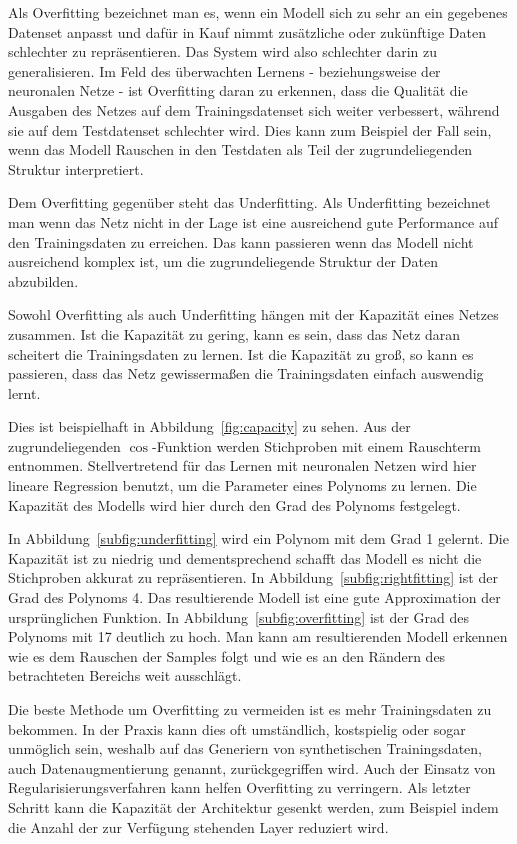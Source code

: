 Als Overfitting bezeichnet man es, wenn ein Modell sich zu sehr an ein gegebenes Datenset anpasst und 
dafür in Kauf nimmt zusätzliche oder zukünftige Daten schlechter zu repräsentieren.
Das System wird also schlechter darin zu generalisieren.
Im Feld des überwachten Lernens - beziehungsweise der neuronalen Netze - ist Overfitting daran zu erkennen,
dass die Qualität die Ausgaben des Netzes auf dem Trainingsdatenset sich weiter verbessert,
während sie auf dem Testdatenset schlechter wird.
Dies kann zum Beispiel der Fall sein, wenn das Modell Rauschen in den Testdaten als Teil der zugrundeliegenden Struktur interpretiert. 


Dem Overfitting gegenüber steht das Underfitting. 
Als Underfitting bezeichnet man wenn das Netz nicht in der Lage ist
eine ausreichend gute Performance auf den Trainingsdaten zu erreichen.
Das kann passieren wenn das Modell nicht ausreichend komplex ist, um die zugrundeliegende Struktur der Daten abzubilden.


Sowohl Overfitting als auch Underfitting hängen mit der Kapazität eines Netzes zusammen.
Ist die Kapazität zu gering, kann es sein, dass das Netz daran scheitert die Trainingsdaten zu lernen.
Ist die Kapazität zu groß, so kann es passieren, dass das Netz gewissermaßen die Trainingsdaten einfach auswendig lernt.

Dies ist beispielhaft in Abbildung~\ref{fig:capacity} zu sehen.
Aus der zugrundeliegenden \( \cos \)-Funktion werden Stichproben mit einem Rauschterm entnommen. 
Stellvertretend für das Lernen mit neuronalen Netzen wird hier lineare Regression benutzt,
um die Parameter eines Polynoms zu lernen.
Die Kapazität des Modells wird hier durch den Grad des Polynoms festgelegt.

In Abbildung~\ref{subfig:underfitting} wird ein Polynom mit dem Grad 1 gelernt.
Die Kapazität ist zu niedrig und dementsprechend schafft das Modell es nicht die Stichproben akkurat zu repräsentieren.
In Abbildung~\ref{subfig:rightfitting} ist der Grad des Polynoms 4.
Das resultierende Modell ist eine gute Approximation der ursprünglichen Funktion.
In Abbildung~\ref{subfig:overfitting} ist der Grad des Polynoms mit 17 deutlich zu hoch.
Man kann am resultierenden Modell erkennen wie es dem Rauschen der Samples folgt und wie es an den Rändern des betrachteten Bereichs weit ausschlägt.

Die beste Methode um Overfitting zu vermeiden ist es mehr Trainingsdaten zu bekommen.
In der Praxis kann dies oft umständlich, kostspielig oder sogar unmöglich sein, 
weshalb auf das Generiern von synthetischen Trainingsdaten, auch Datenaugmentierung genannt, zurückgegriffen wird.
Auch der Einsatz von Regularisierungsverfahren kann helfen Overfitting zu verringern.
Als letzter Schritt kann die Kapazität der Architektur gesenkt werden,
zum Beispiel indem die Anzahl der zur Verfügung stehenden Layer reduziert wird.

